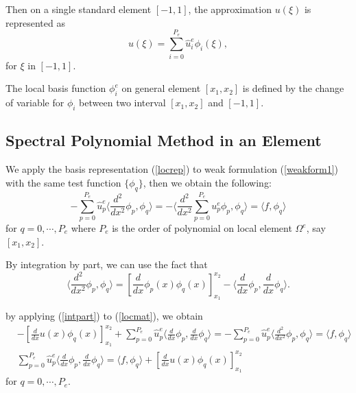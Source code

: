 Then on a single standard element $[-1, 1]$, the approximation $u(\xi)$ is represented as
\begin{equation}\label{locrep}
u(\xi) = \sum_{i=0}^{P_e} \hat u_{i}^{e}\phi_i(\xi),
\end{equation}
for $\xi$ in $[-1, 1]$.

The local basis function $\phi_i^e$ on general element $[x_1, x_2]$ is defined by the change of variable for $\phi_i$ between two interval $[x_1, x_2]$ and $[-1, 1]$.

\subsection{Spectral Polynomial Method in an Element}

We apply the basis representation (\ref{locrep}) to weak formulation (\ref{weakform1}) with the same test function $\{\phi_q\}$, then we obtain the following:
\begin{equation}\label{locmat}
 - \sum_{p=0}^{P_e} \hat u_p^e \langle \frac{d^2}{dx^2} \phi_p, \phi_q \rangle = - \langle \frac{d^2}{dx^2} \sum_{p=0}^{P_e} u_p^e \phi_p, \phi_q \rangle = \langle f, \phi_q \rangle
\end{equation}
for $q = 0, \cdots, P_e$ where $P_e$ is the order of polynomial on local element $\Omega^{e}$, say $\left[ x_1, x_2 \right]$.

By integration by part, we can use the fact that
\begin{equation}\label{intpart}
\langle \frac{d^2}{dx^2} \phi_p, \phi_q \rangle = \left[ \frac{d}{dx}\phi_p(x) \phi_q(x) \right]_{x_1}^{x_2} - \langle \frac{d}{dx} \phi_p, \frac{d}{dx} \phi_q \rangle.
\end{equation}

by applying (\ref{intpart}) to (\ref{locmat}), we obtain
\begin{eqnarray}\label{locmat}
&- \left[\frac{d}{dx}u(x)\phi_q(x) \right]_{x_1}^{x_2} + \sum_{p=0}^{P_e} \hat u_p^e \langle \frac{d}{dx} \phi_p, \frac{d}{dx} \phi_q \rangle
= - \sum_{p=0}^{P_e} \hat u_p^e \langle \frac{d^2}{dx^2} \phi_p, \phi_q \rangle  = \langle f, \phi_q \rangle \\
&\sum_{p=0}^{P_e} \hat u_p^e \langle \frac{d}{dx} \phi_p, \frac{d}{dx} \phi_q \rangle = \langle f, \phi_q \rangle + \left[\frac{d}{dx}u(x)\phi_q(x) \right]_{x_1}^{x_2}
\end{eqnarray}
for $q = 0, \cdots, P_e$.

